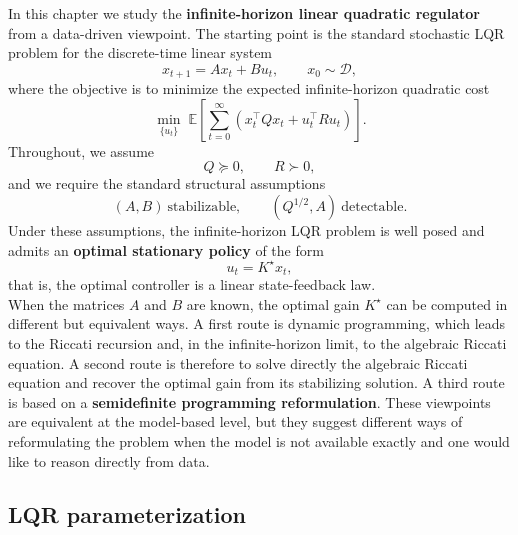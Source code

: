 In this chapter we study the \textbf{infinite-horizon linear quadratic regulator} from a data-driven
viewpoint. The starting point is the standard stochastic LQR problem for the discrete-time
linear system
\[
x_{t+1} = A x_t + B u_t,
\qquad x_0 \sim \mathcal D,
\]
where the objective is to minimize the expected infinite-horizon quadratic cost
\[
\min_{\{u_t\}} \;
\mathbb E\!\left[\sum_{t=0}^{\infty}
\left(x_t^\top Q x_t + u_t^\top R u_t\right)\right].
\]
Throughout, we assume
\[
Q \succeq 0,
\qquad R \succ 0,
\]
and we require the standard structural assumptions
\[
(A,B)\ \text{stabilizable},
\qquad
(Q^{1/2},A)\ \text{detectable}.
\]
Under these assumptions, the infinite-horizon LQR problem is well posed and admits an
\textbf{optimal stationary policy} of the form
\[
u_t = K^\star x_t,
\]
that is, the optimal controller is a linear state-feedback law.\\

When the matrices $A$ and $B$ are known, the optimal gain $K^\star$ can be computed in
different but equivalent ways. A first route is dynamic programming, which leads to the
Riccati recursion and, in the infinite-horizon limit, to the algebraic Riccati equation.
A second route is therefore to solve directly the algebraic Riccati equation and recover the
optimal gain from its stabilizing solution. A third route is based on a \textbf{semidefinite programming
reformulation}. These viewpoints are equivalent at the model-based level, but they suggest
different ways of reformulating the problem when the model is not available exactly and one
would like to reason directly from data.

\subsection{LQR parameterization}

